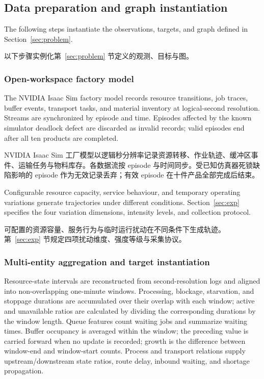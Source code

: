 \documentclass[a4paper,fleqn]{cas-dc}
\newcommand{\zhpara}[1]{%
  \par\begingroup\small\color{black!72}\noindent #1\par\endgroup}
\begin{document}
\subsection{Data preparation and graph instantiation}

The following steps instantiate the observations, targets, and graph defined in Section~\ref{sec:problem}.

\zhpara{以下步骤实例化第~\ref{sec:problem} 节定义的观测、目标与图。}


\subsubsection{Open-workspace factory model}

The NVIDIA Isaac Sim factory model records resource transitions, job traces, buffer events, transport tasks, and material inventory at logical-second resolution. Streams are synchronized by episode and time. Episodes affected by the known simulator deadlock defect are discarded as invalid records; valid episodes end after all ten products are completed.

\zhpara{NVIDIA Isaac Sim 工厂模型以逻辑秒分辨率记录资源转移、作业轨迹、缓冲区事件、运输任务与物料库存。各数据流按 episode 与时间同步。受已知仿真器死锁缺陷影响的 episode 作为无效记录丢弃；有效 episode 在十件产品全部完成后结束。}


Configurable resource capacity, service behaviour, and temporary operating variations generate trajectories under different conditions. Section~\ref{sec:exp} specifies the four variation dimensions, intensity levels, and collection protocol.

\zhpara{可配置的资源容量、服务行为与临时运行扰动在不同条件下生成轨迹。第~\ref{sec:exp} 节规定四项扰动维度、强度等级与采集协议。}


\subsubsection{Multi-entity aggregation and target instantiation}

Resource-state intervals are reconstructed from second-resolution logs and aligned into non-overlapping one-minute windows. Processing, blockage, starvation, and stoppage durations are accumulated over their overlap with each window; active and unavailable ratios are calculated by dividing the corresponding durations by the window length. Queue features count waiting jobs and summarize waiting times. Buffer occupancy is averaged within the window; the preceding value is carried forward when no update is recorded; growth is the difference between window-end and window-start counts. Process and transport relations supply upstream/downstream state ratios, route delay, inbound waiting, and shortage propagation.
\end{document}
